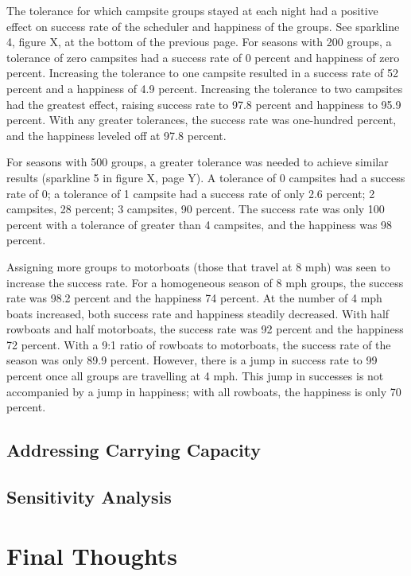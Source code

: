 \documentclass[11pt]{article} %
\begin{document}
The tolerance for which campsite groups stayed at each night had a positive
effect on success rate of the scheduler and happiness of the groups. See
sparkline 4, figure X, at the bottom of the previous page. For seasons with
200 groups, a tolerance of zero campsites had a success rate of 0 percent
and happiness of zero percent. Increasing the tolerance to one campsite
resulted in a success rate of 52 percent and a happiness of 4.9 percent.
Increasing the tolerance to two campsites had the greatest effect, raising
success rate to 97.8 percent and happiness to 95.9 percent. With any greater
tolerances, the success rate was one-hundred percent, and the happiness
leveled off at 97.8 percent.

For seasons with 500 groups, a greater tolerance was needed to achieve
similar results (sparkline 5 in figure X, page Y). A tolerance of 0 campsites
had a success rate of 0; a tolerance of 1 campsite had a success rate of
only 2.6 percent; 2 campsites, 28 percent; 3 campsites, 90 percent. The
success rate was only 100 percent with a tolerance of greater than 4 campsites,
and the happiness was 98 percent.

Assigning more groups to motorboats (those that travel at 8 mph) was seen
to increase the success rate. For a homogeneous season of 8 mph groups, the
success rate was 98.2 percent and the happiness 74 percent. At the number
of 4 mph boats increased, both success rate and happiness steadily decreased.
With half rowboats and half motorboats, the success rate was 92 percent and
the happiness 72 percent. With a 9:1 ratio of rowboats to motorboats, the
success rate of the season was only 89.9 percent. However, there is a jump
in success rate to 99 percent once all groups are travelling at 4 mph. This
jump in successes is not accompanied by a jump in happiness; with all
rowboats, the happiness is only 70 percent.

\subsection{Addressing Carrying Capacity}
\label{sec:capacity}

\subsection{Sensitivity Analysis}
\label{sec:sensitivity}

\section{Final Thoughts}
\label{sec:conclusions}
\end{document}
